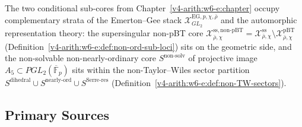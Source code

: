 The two conditional sub-cores from Chapter~\ref{v4-arith:w6-e:chapter}
occupy complementary strata of the Emerton--Gee stack
\(\mathcal{X}^{\mathrm{EG},p,\chi,\bar\rho}_{GL_{2}}\) and the
automorphic representation theory: the supersingular non-pBT core
\(\mathcal{X}^{\mathrm{ss,non\text{-}pBT}}_{\bar\rho,\chi}
=\mathcal{X}^{\mathrm{ss}}_{\bar\rho,\chi}\setminus
\mathcal{X}^{\mathrm{pBT}}_{\bar\rho,\chi}\)
(Definition~\ref{v4-arith:w6-e:def:non-ord-sub-loci}) sits on the geometric side,
and the non-solvable non-nearly-ordinary core
\(S^{\mathrm{non\text{-}solv}}\) of projective image
\(A_{5}\subset PGL_{2}(\overline{\mathbb{F}}_{p})\) sits within the
non-Taylor--Wiles sector partition
\(S^{\mathrm{dihedral}}\cup S^{\mathrm{nearly\text{-}ord}}\cup
S^{\mathrm{Serre\text{-}res}}\)
(Definition~\ref{v4-arith:w6-e:def:non-TW-sectors}).

\subsection{Primary Sources}
\label{v4-arith:w10-f:sources}

